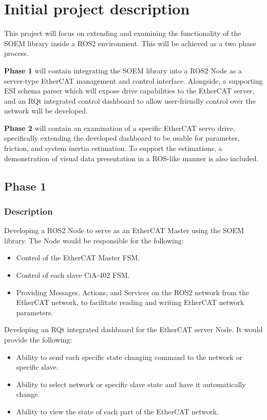 \section{Initial project description}

This project will focus on extending and examining the functionality of the SOEM library inside a ROS2 environment. This will be achieved as a two phase process. 

\textbf{Phase 1} will contain integrating the SOEM library into a ROS2 Node as a server-type EtherCAT management and control interface. Alongside, a supporting ESI schema parser which will expose drive capabilities to the EtherCAT server, and an RQt integrated control dashboard to allow user-friendly control over the network will be developed. 

\textbf{Phase 2} will contain an examination of a specific EtherCAT servo drive, specifically extending the developed dashboard to be usable for parameter, friction, and system inertia estimation. To support the estimations, a demonstration of visual data presentation in a ROS-like manner is also included. 

\subsection{Phase 1}
\subsubsection{Description}

\noindent
Developing a ROS2 Node to serve as an EtherCAT Master using the SOEM library. The Node would be responsible for the following:  

\vspace{6pt}
\begin{itemize}[nosep]
	\item Control of the EtherCAT Master FSM.
	\item Control of each slave CiA-402 FSM.
	\item Providing Messages, Actions, and Services on the ROS2 network from the EtherCAT network, to facilitate reading and writing EtherCAT network parameters. 
\end{itemize}
\vspace{6pt}

\noindent
Developing an RQt integrated dashboard for the EtherCAT server Node. It would provide the following:

\vspace{6pt}
\begin{itemize}[nosep]
	\item Ability to send each specific state changing command to the network or specific slave.
	\item Ability to select network or specific slave state and have it automatically change.
	\item Ability to view the state of each part of the EtherCAT network.
\end{itemize}
\vspace{6pt}

